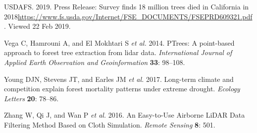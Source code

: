\documentclass[]{article}
\begin{document}
\hypertarget{ref-usdafs2019}{}
USDAFS. 2019. Press Release: Survey finds 18 million trees died in
California in
2018\url{https://www.fs.usda.gov/Internet/FSE_DOCUMENTS/FSEPRD609321.pdf}.
Viewed 22 Feb 2019.

\hypertarget{ref-vega2014}{}
Vega C, Hamrouni A, and El Mokhtari S \emph{et al.} 2014. PTrees: A
point-based approach to forest tree extraction from lidar data.
\emph{International Journal of Applied Earth Observation and
Geoinformation} \textbf{33}: 98--108.

\hypertarget{ref-young2017}{}
Young DJN, Stevens JT, and Earles JM \emph{et al.} 2017. Long-term
climate and competition explain forest mortality patterns under extreme
drought. \emph{Ecology Letters} \textbf{20}: 78--86.

\hypertarget{ref-zhang2016}{}
Zhang W, Qi J, and Wan P \emph{et al.} 2016. An Easy-to-Use Airborne
LiDAR Data Filtering Method Based on Cloth Simulation. \emph{Remote
Sensing} \textbf{8}: 501.
\end{document}
